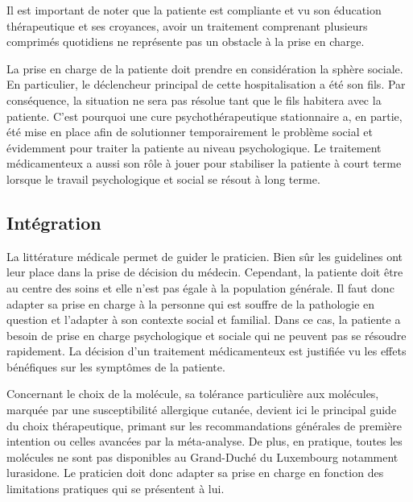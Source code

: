 Il est important de noter que la patiente est compliante et vu son éducation thérapeutique et ses croyances, avoir un traitement comprenant plusieurs comprimés quotidiens ne représente pas un obstacle à la prise en charge.

La prise en charge de la patiente doit prendre en considération la sphère sociale. En particulier, le déclencheur principal de cette hospitalisation a été son fils. Par conséquence, la situation ne sera pas résolue tant que le fils habitera avec la patiente. C’est pourquoi une cure psychothérapeutique stationnaire a, en partie, été mise en place afin de solutionner temporairement le problème social et évidemment pour traiter la patiente au niveau psychologique. Le traitement médicamenteux a aussi son rôle à jouer pour stabiliser la patiente à court terme lorsque le travail psychologique et social se résout à long terme. 

\subsection{Intégration}
La littérature médicale permet de guider le praticien. Bien sûr les guidelines ont leur place dans la prise de décision du médecin. Cependant, la patiente doit être au centre des soins et elle n’est pas égale à la population générale. Il faut donc adapter sa prise en charge à la personne qui est souffre de la pathologie en question et l’adapter à son contexte social et familial. Dans ce cas, la patiente a besoin de prise en charge psychologique et sociale qui ne peuvent pas se résoudre rapidement. La décision d’un traitement médicamenteux est justifiée vu les effets bénéfiques sur les symptômes de la patiente.

Concernant le choix de la molécule, sa tolérance particulière aux molécules, marquée par une susceptibilité allergique cutanée, devient ici le principal guide du choix thérapeutique, primant sur les recommandations générales de première intention ou celles avancées par la méta-analyse. De plus, en pratique, toutes les molécules ne sont pas disponibles au Grand-Duché du Luxembourg notamment lurasidone. Le praticien doit donc adapter sa prise en charge en fonction des limitations pratiques qui se présentent à lui.